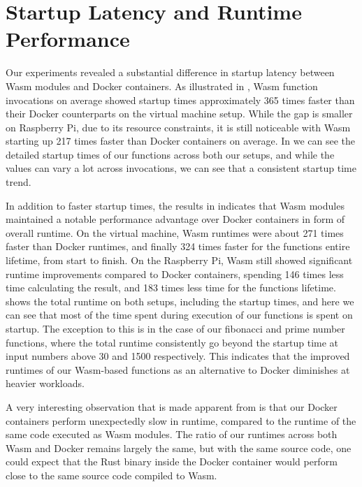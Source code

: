 \documentclass[
  table]{report}
\begin{document}
\section{Startup Latency and Runtime Performance}

Our experiments revealed a substantial difference in startup latency
between \ac{Wasm} modules and Docker containers. As illustrated in
, \ac{Wasm} function invocations on
average showed startup times approximately 365 times faster than their
Docker counterparts on the virtual machine setup. While the gap is
smaller on Raspberry Pi, due to its resource constraints, it is still
noticeable with \ac{Wasm} starting up 217 times faster than Docker
containers on average. In 
we can see the detailed startup times of our functions across both our
setups, and while the values can vary a lot across invocations, we can
see that a consistent startup time trend.

In addition to faster startup times, the results in
 indicates that \ac{Wasm} modules
maintained a notable performance advantage over Docker containers in
form of overall runtime. On the virtual machine, \ac{Wasm} runtimes were
about 271 times faster than Docker runtimes, and finally 324 times
faster for the functions entire lifetime, from start to finish. On the
Raspberry Pi, \ac{Wasm} still showed significant runtime improvements
compared to Docker containers, spending 146 times less time calculating
the result, and 183 times less time for the functions lifetime.
 shows the total runtime on
both setups, including the startup times, and here we can see that most
of the time spent during execution of our functions is spent on startup.
The exception to this is in the case of our fibonacci and prime number
functions, where the total runtime consistently go beyond the startup
time at input numbers above 30 and 1500 respectively. This indicates
that the improved runtimes of our \ac{Wasm}-based functions as an
alternative to Docker diminishes at heavier workloads.

A very interesting observation that is made apparent from
 is that our Docker containers perform
unexpectedly slow in runtime, compared to the runtime of the same code
executed as \ac{Wasm} modules. The ratio of our runtimes across both
\ac{Wasm} and Docker remains largely the same, but with the same source
code, one could expect that the Rust binary inside the Docker container
would perform close to the same source code compiled to \ac{Wasm}.
\end{document}
